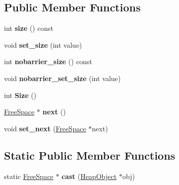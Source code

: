 \subsection*{Public Member Functions}
\begin{DoxyCompactItemize}
\item 
int {\bfseries size} () const \hypertarget{classv8_1_1internal_1_1_free_space_a083a8d11a9816c6fb13d6bbc8454294e}{}\label{classv8_1_1internal_1_1_free_space_a083a8d11a9816c6fb13d6bbc8454294e}

\item 
void {\bfseries set\+\_\+size} (int value)\hypertarget{classv8_1_1internal_1_1_free_space_ae6e7329405deeb3d629da55f78a56a86}{}\label{classv8_1_1internal_1_1_free_space_ae6e7329405deeb3d629da55f78a56a86}

\item 
int {\bfseries nobarrier\+\_\+size} () const \hypertarget{classv8_1_1internal_1_1_free_space_a3f4419a93449d772251e418cbee60b81}{}\label{classv8_1_1internal_1_1_free_space_a3f4419a93449d772251e418cbee60b81}

\item 
void {\bfseries nobarrier\+\_\+set\+\_\+size} (int value)\hypertarget{classv8_1_1internal_1_1_free_space_a756059d000a3aee50bc95ff823fe6255}{}\label{classv8_1_1internal_1_1_free_space_a756059d000a3aee50bc95ff823fe6255}

\item 
int {\bfseries Size} ()\hypertarget{classv8_1_1internal_1_1_free_space_add46e42a33fdf2fca5a450f278f54f48}{}\label{classv8_1_1internal_1_1_free_space_add46e42a33fdf2fca5a450f278f54f48}

\item 
\hyperlink{classv8_1_1internal_1_1_free_space}{Free\+Space} $\ast$ {\bfseries next} ()\hypertarget{classv8_1_1internal_1_1_free_space_ad6b65705011e8b68d15f1982412d748a}{}\label{classv8_1_1internal_1_1_free_space_ad6b65705011e8b68d15f1982412d748a}

\item 
void {\bfseries set\+\_\+next} (\hyperlink{classv8_1_1internal_1_1_free_space}{Free\+Space} $\ast$next)\hypertarget{classv8_1_1internal_1_1_free_space_a6310268fe3056a1ba45db0daeb66229b}{}\label{classv8_1_1internal_1_1_free_space_a6310268fe3056a1ba45db0daeb66229b}

\end{DoxyCompactItemize}
\subsection*{Static Public Member Functions}
\begin{DoxyCompactItemize}
\item 
static \hyperlink{classv8_1_1internal_1_1_free_space}{Free\+Space} $\ast$ {\bfseries cast} (\hyperlink{classv8_1_1internal_1_1_heap_object}{Heap\+Object} $\ast$obj)\hypertarget{classv8_1_1internal_1_1_free_space_aa3f4712f46d50f0bd97622c0db7c2701}{}\label{classv8_1_1internal_1_1_free_space_aa3f4712f46d50f0bd97622c0db7c2701}

\end{DoxyCompactItemize}
